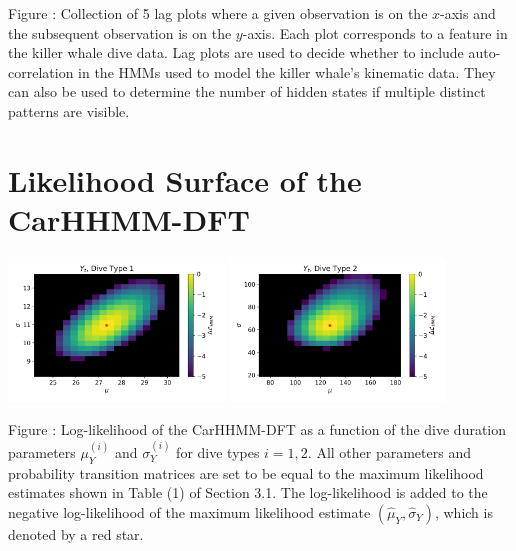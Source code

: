 \documentclass{article}
\begin{document}
        \noindent Figure : Collection of 5 lag plots where a given observation is on the $x$-axis and the subsequent observation is on the $y$-axis. Each plot corresponds to a feature in the killer whale dive data. Lag plots are used to decide whether to include auto-correlation in the HMMs used to model the killer whale's kinematic data. They can also be used to determine the number of hidden states if multiple distinct patterns are visible. 
        \addtocounter{fignum}{1}
        
        \newpage
        
    \section{Likelihood Surface of the CarHHMM-DFT}
    
        \begin{center}
        \includegraphics[width=2.25in]{../Plots/2019/20190902-182840-CATs_OB_1_0_267_CarHHMM2_coarse-theta-likelihood-dive_duration-1.png}
        \includegraphics[width=2.25in]{../Plots/2019/20190902-182840-CATs_OB_1_0_267_CarHHMM2_coarse-theta-likelihood-dive_duration-2.png}
        \end{center}
        
        \noindent Figure : Log-likelihood of the CarHHMM-DFT as a function of the dive duration parameters $\mu_Y^{(i)}$ and $\sigma_Y^{(i)}$ for dive types $i = 1,2$. All other parameters and probability transition matrices are set to be equal to the maximum likelihood estimates shown in Table (1) of Section 3.1. The log-likelihood is added to the negative log-likelihood of the maximum likelihood estimate $(\hat \mu_Y,\hat \sigma_Y)$, which is denoted by a red star.
        \addtocounter{fignum}{1}
        
\end{document}
